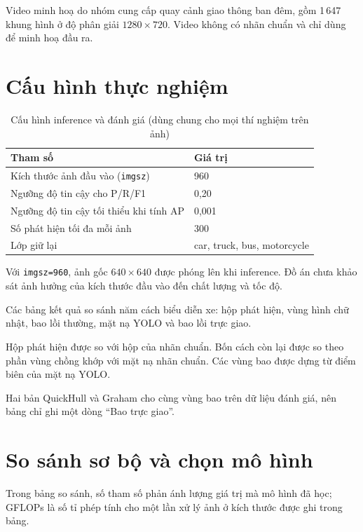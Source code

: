 Video minh hoạ do nhóm cung cấp quay cảnh giao thông ban đêm, gồm 1\,647 khung hình ở độ phân giải $1280\times720$. Video không có nhãn chuẩn và chỉ dùng để minh hoạ đầu ra.

\section{Cấu hình thực nghiệm}

\begin{table}[H]
\centering
\caption{Cấu hình inference và đánh giá (dùng chung cho mọi thí nghiệm trên ảnh)}
\label{tab:config}
\begin{tabular}{ll}
\toprule
Tham số & Giá trị \\
\midrule
Kích thước ảnh đầu vào (\texttt{imgsz}) & 960 \\
Ngưỡng độ tin cậy cho P/R/F1 & 0,20 \\
Ngưỡng độ tin cậy tối thiểu khi tính AP & 0,001 \\
Số phát hiện tối đa mỗi ảnh & 300 \\
Lớp giữ lại & car, truck, bus, motorcycle \\
\bottomrule
\end{tabular}
\end{table}

Với \texttt{imgsz=960}, ảnh gốc $640\times640$ được phóng lên khi inference.
Đồ án chưa khảo sát ảnh hưởng của kích thước đầu vào đến chất lượng và tốc độ.

Các bảng kết quả so sánh năm cách biểu diễn xe: hộp phát hiện, vùng hình chữ nhật, bao lồi thường, mặt nạ YOLO và bao lồi trực giao.

Hộp phát hiện được so với hộp của nhãn chuẩn. Bốn cách còn lại được so theo phần vùng chồng khớp với mặt nạ nhãn chuẩn. Các vùng bao được dựng từ điểm biên của mặt nạ YOLO.

Hai bản QuickHull và Graham cho cùng vùng bao trên dữ liệu đánh giá, nên bảng chỉ ghi một dòng ``Bao trực giao''.

\section{So sánh sơ bộ và chọn mô hình}
\label{sec:model_select}

Trong bảng so sánh, số tham số phản ánh lượng giá trị mà mô hình đã học; GFLOPs là số tỉ phép tính cho một lần xử lý ảnh ở kích thước được ghi trong bảng.

